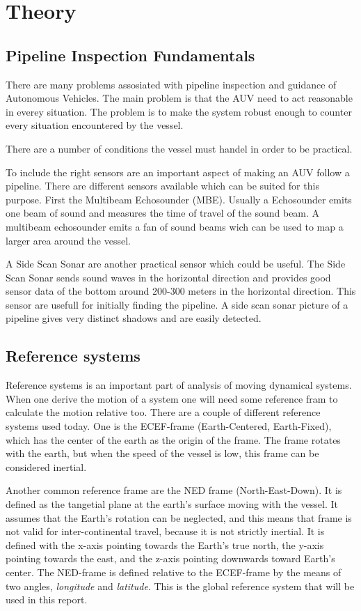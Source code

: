 \chapter{Theory}

\section{Pipeline Inspection Fundamentals}
	There are many problems assosiated with pipeline inspection and guidance of Autonomous Vehicles. The
	main problem is that the AUV need to act reasonable in everey situation. The problem is to make the
	system robust enough to counter every situation encountered by the vessel. 

	There are a number of conditions the vessel must handel in order to be practical.
	
	To include the right sensors are an important aspect of making an AUV follow a pipeline. There are
	different sensors available which can be suited for this purpose. First the Multibeam Echosounder
	(MBE). Usually a Echosounder emits one beam of sound and measures the time of travel of the sound
	beam. A multibeam echosounder emits a fan of sound beams wich can be used to map a larger area around
	the vessel.

	A Side Scan Sonar are another practical sensor which could be useful. The Side Scan Sonar sends sound
	waves in the horizontal direction and provides good sensor data of the bottom around 200-300 meters in
	the horizontal direction. This sensor are usefull for initially finding the pipeline. A side scan
	sonar picture of a pipeline gives very distinct shadows and are easily detected. 
	
\section{Reference systems}
	Reference systems is an important part of analysis of moving dynamical systems. When one derive the motion of 
	a system one will need some reference fram to calculate the motion relative too. There are a couple of different 
	reference systems used today. One is the ECEF-frame (Earth-Centered, Earth-Fixed), which has the center of the 
	earth as the origin of the frame. The frame rotates with the earth, but when the speed of the vessel is low, 
	this frame can be considered inertial. \cite{gps_bok}
	
	Another common reference frame are the NED frame (North-East-Down). It is defined as the tangetial plane at 
	the earth's surface moving with the vessel. It assumes that the Earth's rotation can be neglected, and this means 
	that frame is not valid for inter-continental travel, because it is not strictly inertial. It is defined with 
	the x-axis pointing towards the Earth's true north, the y-axis pointing towards the east, and the z-axis 
	pointing downwards toward Earth's center. The NED-frame is defined relative to the ECEF-frame by the means of 
	two angles, \textit{longitude} and \textit{latitude}. This is the global reference system that will be used 
	in this report. \cite{fossen}
	
